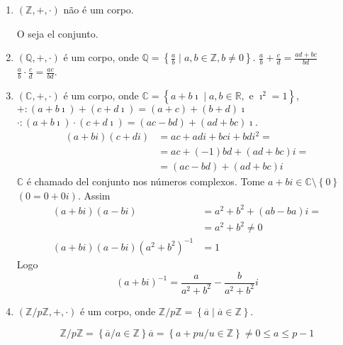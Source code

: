 \begin{example}
	\begin{enumerate}\leavevmode
		\item

		      $\left(\mathbb{Z},+,\cdot\right)$ não é um corpo.

		      O seja el conjunto.

		\item

		      $\left(\mathbb{Q},+,\cdot\right)$ é um corpo, onde
		      $\mathbb{Q}=\left\{\frac{a}{b}\mid a,b\in\mathbb{Z},b\neq0\right\}$.
		      $\frac{a}{b}+\frac{c}{d}=\frac{ad+bc}{bd}$
		      $\frac{a}{b}\cdot\frac{c}{d}=\frac{ac}{bd}$.

		\item

		      $\left(\mathbb{C},+,\cdot\right)$ é um corpo, onde
		      $\mathbb{C}=\left\{a+b\imath\mid a,b\in\mathbb{R},\text{ e }\imath^{2}=1\right\}$,
		      $+\colon\left(a+b\imath\right)+\left(c+d\imath\right)=\left(a+c\right)+\left(b+d\right)\imath$
		      $\cdot\colon\left(a+b\imath\right)\cdot\left(c+d\imath\right)=\left(ac-bd\right)+\left(ad+bc\right)\imath$.
		      \begin{align*}
			      \left(a+bi\right)\left(c+di\right)
			       & =ac+adi+bci+bdi^{2}=                       \\
			       & =ac+\left(-1\right)bd+\left(ad+bc\right)i= \\
			       & =\left(ac-bd\right)+\left(ad+bc\right)i
		      \end{align*}
		      $\mathbb{C}$ é chamado del conjunto nos números complexos.
		      Tome $a+bi\in\mathbb{C}\setminus\left\{0\right\}$
		      $(0=0+0i)$.
		      Assim
		      \begin{align*}
			      \left(a+bi\right)\left(a-bi\right)
			       & =a^{2}+b^{2}+\left(ab-ba\right)i= \\
			       & =a^{2}+b^{2} \neq 0               \\
			      \left(a+bi\right)\left(a-bi\right)
			      \left(a^{2}+b^{2}\right)^{-1}
			       & =1
		      \end{align*}
		      Logo
		      $$
			      \left(a+bi\right)^{-1}=
			      \frac{a}{a^{2}+b^{2}}-
			      \frac{b}{a^{2}+b^{2}}i
		      $$

		\item

		      $\left(\mathbb{Z}/p\mathbb{Z},+,\cdot\right)$ é um corpo, onde $\mathbb{Z}/p\mathbb{Z}=\left\{\overline{a}\mid \overline{a}\in\mathbb{Z}\right\}$.

		      \[
			      \mathbb{Z}/p\mathbb{Z}=
			      \left\{\overline{a}/a\in\mathbb{Z}\right\}
			      \overline{a}=
			      \left\{a+pu/u\in\mathbb{Z}\right\}
			      \neq0\leq a\leq p-1
		      \]

	\end{enumerate}
\end{example}

